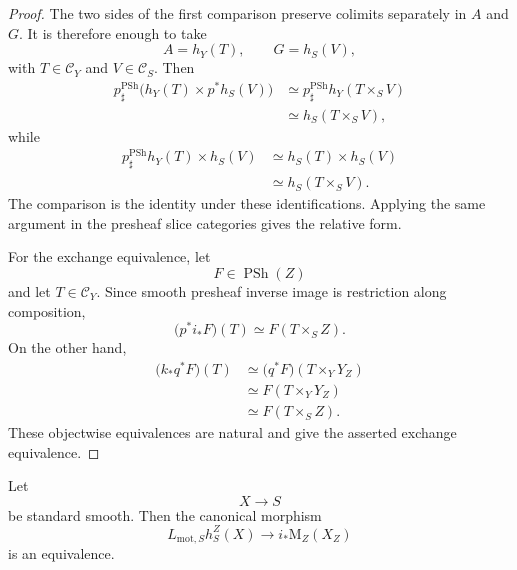 \begin{proof}
The two sides of the first comparison preserve colimits separately in
\(A\) and \(G\).  It is therefore enough to take
\[
    A=h_Y(T),
    \qquad
    G=h_S(V),
\]
with \(T\in\mathcal C_Y\) and \(V\in\mathcal C_S\).  Then
\[
\begin{aligned}
    p^{\operatorname{PSh}}_\sharp
    \bigl(
        h_Y(T)\times p^*h_S(V)
    \bigr)
    &\simeq
    p^{\operatorname{PSh}}_\sharp
    h_Y(T\times_SV)
    \\
    &\simeq
    h_S(T\times_SV),
\end{aligned}
\]
while
\[
\begin{aligned}
    p^{\operatorname{PSh}}_\sharp h_Y(T)
    \times h_S(V)
    &\simeq
    h_S(T)\times h_S(V)
    \\
    &\simeq
    h_S(T\times_SV).
\end{aligned}
\]
The comparison is the identity under these identifications.  Applying
the same argument in the presheaf slice categories gives the relative
form.

For the exchange equivalence, let
\[
    F
    \in
    \operatorname{PSh}(Z)
\]
and let \(T\in\mathcal C_Y\).  Since smooth presheaf inverse image is
restriction along composition,
\[
    \bigl(
        p^*i_*F
    \bigr)(T)
    \simeq
    F(T\times_SZ).
\]
On the other hand,
\[
\begin{aligned}
    \bigl(
        k_*q^*F
    \bigr)(T)
    &\simeq
    \bigl(
        q^*F
    \bigr)(T\times_YY_Z)
    \\
    &\simeq
    F(T\times_YY_Z)
    \\
    &\simeq
    F(T\times_SZ).
\end{aligned}
\]
These objectwise equivalences are natural and give the asserted
exchange equivalence.
\end{proof}


\begin{proposition}
\label{prop:localization-standard-smooth-motive}
Let
\[
    X
    \longrightarrow
    S
\]
be standard smooth.  Then the canonical morphism
\[
    L_{\mathrm{mot},S}h_S^Z(X)
    \longrightarrow
    i_*\mathrm M_Z(X_Z)
\]
is an equivalence.
\end{proposition}

